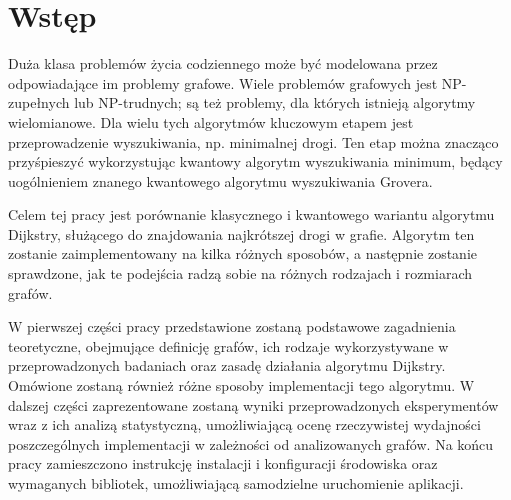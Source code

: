 \chapter{Wstęp}

Duża klasa problemów życia codziennego może być modelowana przez odpowiadające im problemy grafowe. Wiele problemów grafowych jest NP-zupełnych lub NP-trudnych; są też problemy, dla których istnieją algorytmy wielomianowe. Dla wielu tych algorytmów kluczowym etapem jest przeprowadzenie wyszukiwania, np. minimalnej drogi. Ten etap można znacząco przyśpieszyć wykorzystując kwantowy algorytm wyszukiwania minimum, będący uogólnieniem znanego kwantowego algorytmu wyszukiwania Grovera. 

Celem tej pracy jest porównanie klasycznego i kwantowego wariantu algorytmu Dijkstry, służącego do znajdowania najkrótszej drogi w grafie. Algorytm ten zostanie zaimplementowany na kilka różnych sposobów, a następnie zostanie sprawdzone, jak te podejścia radzą sobie na różnych rodzajach i rozmiarach grafów.

W pierwszej części pracy przedstawione zostaną podstawowe zagadnienia teoretyczne, obejmujące definicję grafów, ich rodzaje wykorzystywane w przeprowadzonych badaniach oraz zasadę działania algorytmu Dijkstry. Omówione zostaną również różne sposoby implementacji tego algorytmu. W dalszej części zaprezentowane zostaną wyniki przeprowadzonych eksperymentów wraz z ich analizą statystyczną, umożliwiającą ocenę rzeczywistej wydajności poszczególnych implementacji w zależności od analizowanych grafów. Na końcu pracy zamieszczono instrukcję instalacji i konfiguracji środowiska oraz wymaganych bibliotek, umożliwiającą samodzielne uruchomienie aplikacji.